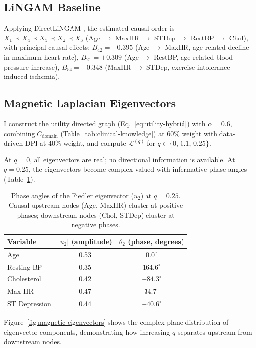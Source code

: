 \documentclass[twoside,11pt]{article}
\begin{document}
\subsection{LiNGAM Baseline}
\label{sec:lingam-baseline}

Applying DirectLiNGAM \citep{Shimizu2011}, the estimated causal order is
$X_1\prec X_4\prec X_5\prec X_2\prec X_3$
(Age $\to$ MaxHR $\to$ STDep $\to$ RestBP $\to$ Chol), with principal
causal effects: $B_{42}=-0.395$ (Age $\to$ MaxHR, age-related decline in
maximum heart rate), $B_{21}=+0.309$ (Age $\to$ RestBP, age-related
blood pressure increase), $B_{54}=-0.348$ (MaxHR $\to$ STDep,
exercise-intolerance-induced ischemia).

\subsection{Magnetic Laplacian Eigenvectors}

I construct the utility directed graph (Eq.~\ref{eq:utility-hybrid}) with
$\alpha=0.6$, combining $C_{\mathrm{domain}}$
(Table~\ref{tab:clinical-knowledge}) at 60\% weight with data-driven DPI
at 40\% weight, and compute $\mathcal{L}^{(q)}$ for
$q\in\{0,\,0.1,\,0.25\}$.

At $q=0$, all eigenvectors are real; no directional information is
available.  At $q=0.25$, the eigenvectors become complex-valued with
informative phase angles (Table~\ref{tab:eigenvector-phases}).

\begin{table}[t]
\centering
\caption{Phase angles of the Fiedler eigenvector ($u_2$) at $q=0.25$.
  Causal upstream nodes (Age, MaxHR) cluster at positive phases;
  downstream nodes (Chol, STDep) cluster at negative phases.}
\label{tab:eigenvector-phases}
\begin{tabular}{lcc}
\toprule
Variable & $|u_2|$ (amplitude) & $\theta_2$ (phase, degrees) \\
\midrule
Age & 0.53 & $0.0^\circ$ \\
Resting BP & 0.35 & $164.6^\circ$ \\
Cholesterol & 0.42 & $-84.3^\circ$ \\
Max HR & 0.47 & $34.7^\circ$ \\
ST Depression & 0.44 & $-40.6^\circ$ \\
\bottomrule
\end{tabular}
\end{table}

Figure~\ref{fig:magnetic-eigenvectors} shows the complex-plane
distribution of eigenvector components, demonstrating how increasing $q$
separates upstream from downstream nodes.
\end{document}
